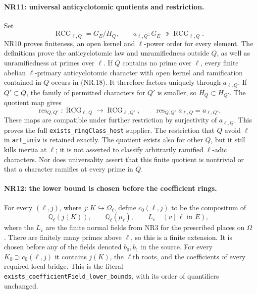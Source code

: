 \paragraph{NR11: universal anticyclotomic quotients and restriction.}
Set
\[
     \operatorname{RCG}_{\ell,Q}=G_E/H_Q,
             \qquad a_{\ell,Q}:G_E\twoheadrightarrow
                                      \operatorname{RCG}_{\ell,Q}.
                                                               \tag{NR.19}
\]
NR10 proves finiteness, an open kernel and $\ell$-power order for
every element. The definitions prove the anticyclotomic law and
unramifiedness outside $Q$, as well as unramifiedness at primes
over $\ell$. If $Q$ contains no prime over $\ell$, every finite
abelian $\ell$-primary anticyclotomic character with open kernel
and ramification contained in $Q$ occurs in (NR.18). It therefore
factors uniquely through $a_{\ell,Q}$. If $Q'\subset Q$, the family
of permitted characters for $Q'$ is smaller, so
$H_Q\subset H_{Q'}$. The quotient map gives
\[
 \operatorname{res}_{Q,Q'}:\operatorname{RCG}_{\ell,Q}
      \longrightarrow\operatorname{RCG}_{\ell,Q'},\qquad
 \operatorname{res}_{Q,Q'}a_{\ell,Q}=a_{\ell,Q'}.        \tag{NR.20}
\]
These maps are compatible under further restriction by surjectivity
of $a_{\ell,Q}$.
This proves the full \texttt{exists\_ringClass\_host} supplier.
The restriction that $Q$ avoid $\ell$ in \texttt{art\_univ} is
retained exactly. The quotient exists also for other $Q$, but it
still kills inertia at $\ell$; it is not asserted to classify
arbitrarily ramified $\ell$-adic characters. Nor does universality
assert that this finite quotient is nontrivial or that a character
ramifies at every prime in $Q$.

\paragraph{NR12: the lower bound is chosen before the coefficient rings.}
For every $(\ell,j)$, where $j:K\hookrightarrow\Omega_\ell$, define
$c_0(\ell,j)$ to be the compositum of
\[
 \mathbb Q_\ell(j(K)),\qquad
 \mathbb Q_\ell(\mu_\ell),\qquad
                 L_v\quad(v\mid\ell\text{ in }E),    \tag{NR.21}
\]
where the $L_v$ are the finite normal fields from NR3 for the
prescribed places on $\Omega$. There are finitely many primes
above $\ell$, so this is a finite extension. It is chosen before
any of the fields denoted $b_0,b_1$ in the source. For every
$K_0\supset c_0(\ell,j)$ it contains $j(K)$, the $\ell$th roots,
and the coefficients of every required local bridge. This is
the literal \texttt{exists\_coefficientField\_lower\_bounds},
with its order of quantifiers unchanged.

